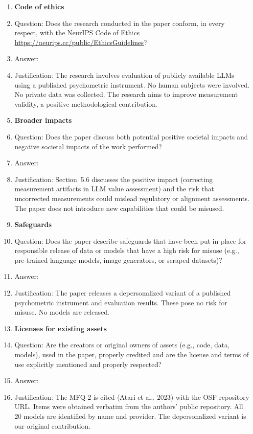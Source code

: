 \begin{enumerate}
\item {\bf Code of ethics}
    \item[] Question: Does the research conducted in the paper conform, in every respect, with the NeurIPS Code of Ethics \url{https://neurips.cc/public/EthicsGuidelines}?
    \item[] Answer: \answerYes{}
    \item[] Justification: The research involves evaluation of publicly available LLMs using a published psychometric instrument. No human subjects were involved. No private data was collected. The research aims to improve measurement validity, a positive methodological contribution.

\item {\bf Broader impacts}
    \item[] Question: Does the paper discuss both potential positive societal impacts and negative societal impacts of the work performed?
    \item[] Answer: \answerYes{}
    \item[] Justification: Section~5.6 discusses the positive impact (correcting measurement artifacts in LLM value assessment) and the risk that uncorrected measurements could mislead regulatory or alignment assessments. The paper does not introduce new capabilities that could be misused.

\item {\bf Safeguards}
    \item[] Question: Does the paper describe safeguards that have been put in place for responsible release of data or models that have a high risk for misuse (e.g., pre-trained language models, image generators, or scraped datasets)?
    \item[] Answer: \answerNA{}
    \item[] Justification: The paper releases a depersonalized variant of a published psychometric instrument and evaluation results. These pose no risk for misuse. No models are released.

\item {\bf Licenses for existing assets}
    \item[] Question: Are the creators or original owners of assets (e.g., code, data, models), used in the paper, properly credited and are the license and terms of use explicitly mentioned and properly respected?
    \item[] Answer: \answerYes{}
    \item[] Justification: The MFQ-2 is cited (Atari et al., 2023) with the OSF repository URL. Items were obtained verbatim from the authors' public repository. All 20 models are identified by name and provider. The depersonalized variant is our original contribution.


\end{enumerate}
